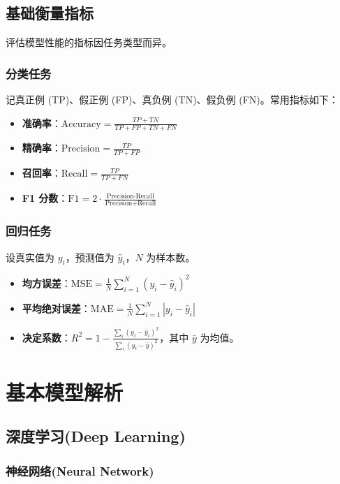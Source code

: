 \documentclass[12pt]{article}
\begin{document}
\subsection{基础衡量指标}
评估模型性能的指标因任务类型而异。
\subsubsection{分类任务}
记真正例 (TP)、假正例 (FP)、真负例 (TN)、假负例 (FN)。常用指标如下：
\begin{itemize}
    \item \textbf{准确率}：$\displaystyle \text{Accuracy}=\frac{TP+TN}{TP+FP+TN+FN}$
    \item \textbf{精确率}：$\displaystyle \text{Precision}=\frac{TP}{TP+FP}$
    \item \textbf{召回率}：$\displaystyle \text{Recall}=\frac{TP}{TP+FN}$
    \item \textbf{F1 分数}：$\displaystyle \text{F1}=2\cdot\frac{\text{Precision}\cdot\text{Recall}}{\text{Precision}+\text{Recall}}$
\end{itemize}

\subsubsection{回归任务}
设真实值为 $y_i$，预测值为 $\hat{y}_i$，$N$ 为样本数。
\begin{itemize}
    \item \textbf{均方误差}：$\displaystyle \text{MSE}=\frac{1}{N}\sum_{i=1}^{N}(y_i-\hat{y}_i)^2$
    \item \textbf{平均绝对误差}：$\displaystyle \text{MAE}=\frac{1}{N}\sum_{i=1}^{N}|y_i-\hat{y}_i|$
    \item \textbf{决定系数}：$\displaystyle R^2=1-\frac{\sum_i(y_i-\hat{y}_i)^2}{\sum_i(y_i-\bar{y})^2}$，其中 $\bar{y}$ 为均值。
\end{itemize}





\section{基本模型解析}
\subsection{深度学习(Deep Learning)}
\subsubsection{神经网络(Neural Network)}
\end{document}
